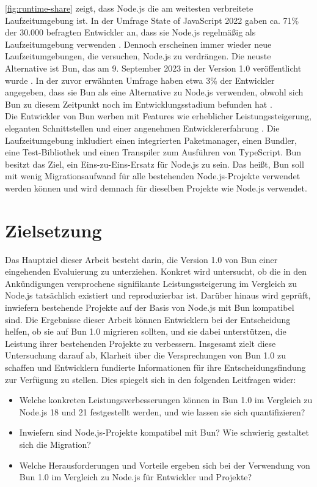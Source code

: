 \noindent
\autoref{fig:runtime-share} zeigt, dass Node.js die am weitesten verbreitete Laufzeitumgebung ist. In der Umfrage \glqq State of JavaScript 2022\grqq{} gaben ca. 71\% der 30.000 befragten Entwickler an, dass sie Node.js regelmäßig als Laufzeitumgebung verwenden \cite{Greif.2022}. Dennoch erscheinen immer wieder neue Laufzeitumgebungen, die versuchen, Node.js zu verdrängen. Die neuste Alternative ist Bun, das am 9. September 2023 in der Version 1.0 veröffentlicht wurde \cite{Sumner.2023c}. In der zuvor erwähnten Umfrage haben etwa 3\% der Entwickler angegeben, dass sie Bun als eine Alternative zu Node.js verwenden, obwohl sich Bun zu diesem Zeitpunkt noch im Entwicklungsstadium befunden hat \cite{Greif.2022}.\\

\noindent
Die Entwickler von Bun werben mit Features wie erheblicher Leistungssteigerung, eleganten Schnittstellen und einer angenehmen Entwicklererfahrung \cite{OvenSh.2023b}. Die Laufzeitumgebung inkludiert einen integrierten Paketmanager, einen Bundler, eine Test-Bibliothek und einen Transpiler zum Ausführen von TypeScript. Bun besitzt das Ziel, ein Eins-zu-Eins-Ersatz für Node.js zu sein. Das heißt, Bun soll mit wenig Migrationsaufwand für alle bestehenden Node.js-Projekte verwendet werden können und wird demnach für dieselben Projekte wie Node.js verwendet.\cite{Sumner.2023c}

\section{Zielsetzung} \label{sec:introduction-target}
Das Hauptziel dieser Arbeit besteht darin, die Version 1.0 von Bun einer eingehenden Evaluierung zu unterziehen. Konkret wird untersucht, ob die in den Ankündigungen versprochene signifikante Leistungssteigerung im Vergleich zu Node.js tatsächlich existiert und reproduzierbar ist. Darüber hinaus wird geprüft, inwiefern bestehende Projekte auf der Basis von Node.js mit Bun kompatibel sind. Die Ergebnisse dieser Arbeit können Entwicklern bei der Entscheidung helfen, ob sie auf Bun 1.0 migrieren sollten, und sie dabei unterstützen, die Leistung ihrer bestehenden Projekte zu verbessern. Insgesamt zielt diese Untersuchung darauf ab, Klarheit über die Versprechungen von Bun 1.0 zu schaffen und Entwicklern fundierte Informationen für ihre Entscheidungsfindung zur Verfügung zu stellen. Dies spiegelt sich in den folgenden Leitfragen wider:
\begin{itemize}
    \item Welche konkreten Leistungsverbesserungen können in Bun 1.0 im Vergleich zu Node.js 18 und 21 festgestellt werden, und wie lassen sie sich quantifizieren?
    \item Inwiefern sind Node.js-Projekte kompatibel mit Bun? Wie schwierig gestaltet sich die Migration?
    \item Welche Herausforderungen und Vorteile ergeben sich bei der Verwendung von Bun 1.0 im Vergleich zu Node.js für Entwickler und Projekte?
\end{itemize}

